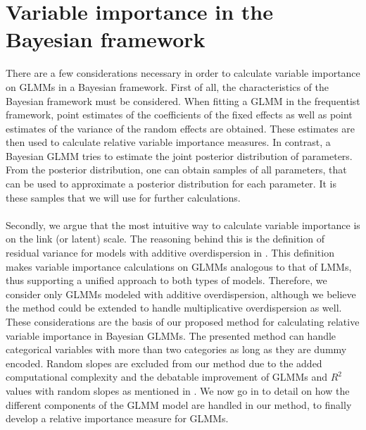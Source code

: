\section{Variable importance in the Bayesian framework}
There are a few considerations necessary in order to calculate variable importance on GLMMs in a Bayesian framework. First of all, the characteristics of the Bayesian framework must be considered. When fitting a GLMM in the frequentist framework, point estimates of the coefficients of the fixed effects as well as point estimates of the variance of the random effects are obtained. These estimates are then used to calculate relative variable importance measures. In contrast, a Bayesian GLMM tries to estimate the joint posterior distribution of parameters. From the posterior distribution, one can obtain samples of all parameters, that can be used to approximate a posterior distribution for each parameter. It is these samples that we will use for further calculations.
\\
\\
Secondly, we argue that the most intuitive way to calculate variable importance is on the link (or latent) scale. The reasoning behind this is the definition of residual variance for models with additive overdispersion in \citet{nakagawa2013general}. This definition makes variable importance calculations on GLMMs analogous to that of LMMs, thus supporting a unified approach to both types of models. Therefore, we consider only GLMMs modeled with additive overdispersion, although we believe the method could be extended to handle multiplicative overdispersion as well.
These considerations are the basis of our proposed method for calculating relative variable importance in Bayesian GLMMs.
The presented method can handle categorical variables with more than two categories as long as they are dummy encoded. Random slopes are excluded from our method due to the added computational complexity and the debatable improvement of GLMMs and $R^2$ values with random slopes as mentioned in \citet{Johnson2014}.
We now go in to detail on how the different components of the GLMM model are handled in our method, to finally develop a relative importance measure for GLMMs.

